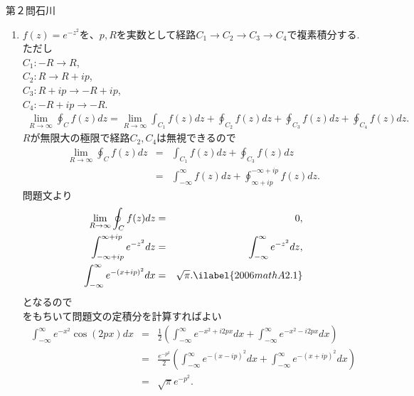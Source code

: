 \begin{answer}{第２問}{石川}
\begin{enumerate}
\item
  $f(z)=e^{-z^2}$を、$p,R$を実数として経路$C_1→C_2→C_3→C_4$で複素積分する.\\
  ただし\\
  $C_1:-R→R$,\\
  $C_2:R→R+ip$,\\
  $C_3:R+ip→-R+ip$,\\
  $C_4:-R+ip→-R$.
  \begin{eqnarray}
    \lim_{R\rightarrow \infty}\oint_{C}f(z)dz = \lim_{R\rightarrow \infty}\int_{C_1}f(z)dz+\oint_{C_2}f(z)dz+\oint_{C_3}f(z)dz+\oint_{C_4}f(z)dz.
  \end{eqnarray}
  $R$が無限大の極限で経路$C_2,C_4$は無視できるので\\
  \begin{eqnarray}
    \lim_{R\rightarrow \infty}\oint_{C}f(z)dz &=& \int_{C_1}f(z)dz+\oint_{C_3}f(z)dz\\
      &=&\int_{-\infty}^{\infty}f(z)dz+\oint_{\infty + ip}^{-\infty + ip}f(z)dz.
  \end{eqnarray}
  問題文より
  \begin{eqnarray}
    \lim_{R\rightarrow \infty}\oint_{C}f(z)dz &=& 0,\\
    \int_{-\infty+ip}^{\infty+ip}e^{-z^2}dz&=&\int_{-\infty}^{\infty}e^{-z^2}dz,\\
    \int_{-\infty}^{\infty}e^{-(x+ip)^2}dx&=&\sqrt{\pi}. \ilabel{2006mathA2.1}
  \end{eqnarray}
  となるので\\
  をもちいて問題文の定積分を計算すればよい\\
  \begin{eqnarray}
    \int_{-\infty}^{\infty}e^{-x^2}\cos(2px)dx &=& \frac{1}{2}\left(\int_{-\infty}^{\infty}e^{-x^2+i2px}dx+\int_{-\infty}^{\infty}e^{-x^2-i2px}dx\right)\\
      &=& \frac{e^{-p^2}}{2}\left(\int_{-\infty}^{\infty}e^{-(x-ip)^2}dx+\int_{-\infty}^{\infty}e^{-(x+ip)^2}dx\right)\\
      &=& \sqrt{\pi}e^{-p^2}.
  \end{eqnarray}
\end{enumerate}
\end{answer}
